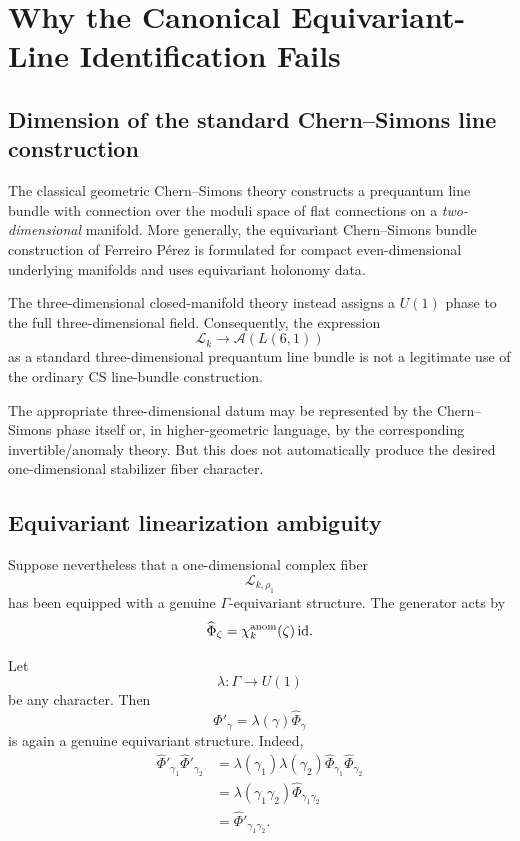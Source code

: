 \documentclass[11pt,a4paper]{article}
\begin{document}
\section{Why the Canonical Equivariant-Line Identification Fails}

\subsection{Dimension of the standard Chern--Simons line construction}

The classical geometric Chern--Simons theory constructs a prequantum line bundle with connection over the moduli space of flat connections on a \emph{two-dimensional} manifold\cite{Freed1995}. More generally, the equivariant Chern--Simons bundle construction of Ferreiro Pérez is formulated for compact even-dimensional underlying manifolds and uses equivariant holonomy data\cite{Ferreiro2019}.

The three-dimensional closed-manifold theory instead assigns a $U(1)$ phase to the full three-dimensional field. Consequently, the expression
\begin{equation}
\mathcal L_k\longrightarrow
\mathcal A(L(6,1))
\end{equation}
as a standard three-dimensional prequantum line bundle is not a legitimate use of the ordinary CS line-bundle construction.

The appropriate three-dimensional datum may be represented by the Chern--Simons phase itself or, in higher-geometric language, by the corresponding invertible/anomaly theory. But this does not automatically produce the desired one-dimensional stabilizer fiber character.

\subsection{Equivariant linearization ambiguity}

Suppose nevertheless that a one-dimensional complex fiber
\begin{equation}
\mathcal L_{k,\rho_1}
\end{equation}
has been equipped with a genuine $\Gamma$-equivariant structure. The generator acts by
\begin{equation}
\widehat\Phi_\zeta
=
\chi_k^{\rm anom}(\zeta)\,\mathrm{id}.
\end{equation}

Let
\begin{equation}
\lambda:\Gamma\to U(1)
\end{equation}
be any character. Then
\begin{equation}
\boxed{
\widehat\Phi'_\gamma
=
\lambda(\gamma)\widehat\Phi_\gamma
}
\end{equation}
is again a genuine equivariant structure. Indeed,
\begin{align}
\widehat\Phi'_{\gamma_1}\widehat\Phi'_{\gamma_2}
&=
\lambda(\gamma_1)\lambda(\gamma_2)
\widehat\Phi_{\gamma_1}\widehat\Phi_{\gamma_2}
\\
&=
\lambda(\gamma_1\gamma_2)
\widehat\Phi_{\gamma_1\gamma_2}
\\
&=
\widehat\Phi'_{\gamma_1\gamma_2}.
\end{align}
\end{document}
